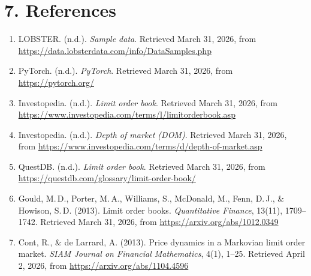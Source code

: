 \documentclass[11pt]{article}
\begin{document}
\section*{7. References}
\begin{enumerate}
    \item LOBSTER. (n.d.). \textit{Sample data}. Retrieved March 31, 2026, from
    \url{https://data.lobsterdata.com/info/DataSamples.php}
    \item PyTorch. (n.d.). \textit{PyTorch}. Retrieved March 31, 2026, from
    \url{https://pytorch.org/}
    \item Investopedia. (n.d.). \textit{Limit order book}. Retrieved March 31,
    2026, from
    \url{https://www.investopedia.com/terms/l/limitorderbook.asp}
    \item Investopedia. (n.d.). \textit{Depth of market (DOM)}. Retrieved March
    31, 2026, from
    \url{https://www.investopedia.com/terms/d/depth-of-market.asp}
    \item QuestDB. (n.d.). \textit{Limit order book}. Retrieved March 31, 2026,
    from \url{https://questdb.com/glossary/limit-order-book/}
    \item Gould, M.\,D., Porter, M.\,A., Williams, S., McDonald, M., Fenn,
    D.\,J., \& Howison, S.\,D. (2013). Limit order books.
    \textit{Quantitative Finance}, 13(11), 1709--1742.
    Retrieved March 31, 2026, from \url{https://arxiv.org/abs/1012.0349}
    \item Cont, R., \& de Larrard, A. (2013). Price dynamics in a Markovian
    limit order market. \textit{SIAM Journal on Financial Mathematics}, 4(1),
    1--25. Retrieved April 2, 2026, from
    \url{https://arxiv.org/abs/1104.4596}
\end{enumerate}
\end{document}
